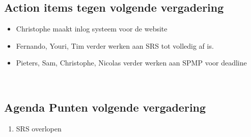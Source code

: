 \subsection{Action items tegen volgende vergadering}
\begin{itemize}
	\item Christophe maakt inlog systeem voor de website
	\item Fernando, Youri, Tim verder werken aan SRS tot volledig af is.
	\item Pieters, Sam, Christophe, Nicolas verder werken aan SPMP voor deadline
\end{itemize}
\mbox{} 
\\
\subsection{Agenda Punten volgende vergadering}
\begin{enumerate}
	\item SRS overlopen
\end{enumerate}

